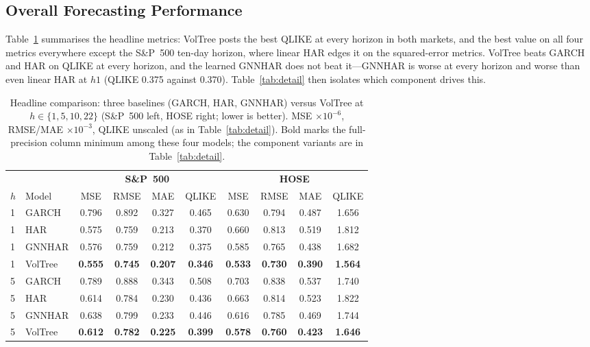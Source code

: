 \documentclass[runningheads]{llncs}
\begin{document}
\subsection{Overall Forecasting Performance}
Table~\ref{tab:summary} summarises the headline metrics: VolTree posts the best QLIKE at every horizon in
both markets, and the best value on all four metrics everywhere except the S\&P~500 ten-day horizon, where
linear HAR edges it on the squared-error metrics. VolTree beats GARCH and HAR on QLIKE at every horizon,
and the learned GNNHAR does not beat it---GNNHAR is worse at every horizon and worse than even linear HAR
at $h1$ (QLIKE 0.375 against 0.370). Table~\ref{tab:detail} then isolates which component drives this.

\begin{table}[h!]
\centering
\caption{Headline comparison: three baselines (GARCH, HAR, GNNHAR) versus VolTree at
$h\in\{1,5,10,22\}$ (S\&P~500 left, HOSE right; lower is better). MSE $\times10^{-6}$, RMSE/MAE
$\times10^{-3}$, QLIKE unscaled (as in Table~\ref{tab:detail}). Bold marks the full-precision column
minimum among these four models; the component variants are in Table~\ref{tab:detail}.}
\label{tab:summary}
\footnotesize
\setlength{\tabcolsep}{3pt}
\begin{tabular}{ll cccc cccc}
\toprule
& & \multicolumn{4}{c}{\textbf{S\&P~500}} & \multicolumn{4}{c}{\textbf{HOSE}} \\
\cmidrule(lr){3-6}\cmidrule(lr){7-10}
$h$ & Model & MSE & RMSE & MAE & QLIKE & MSE & RMSE & MAE & QLIKE \\
\midrule
1 & GARCH    & 0.796 & 0.892 & 0.327 & 0.465 & 0.630 & 0.794 & 0.487 & 1.656 \\
1 & HAR      & 0.575 & 0.759 & 0.213 & 0.370 & 0.660 & 0.813 & 0.519 & 1.812 \\
1 & GNNHAR   & 0.576 & 0.759 & 0.212 & 0.375 & 0.585 & 0.765 & 0.438 & 1.682 \\
1 & VolTree & \textbf{0.555} & \textbf{0.745} & \textbf{0.207} & \textbf{0.346} & \textbf{0.533} & \textbf{0.730} & \textbf{0.390} & \textbf{1.564} \\
\midrule
5 & GARCH    & 0.789 & 0.888 & 0.343 & 0.508 & 0.703 & 0.838 & 0.537 & 1.740 \\
5 & HAR      & 0.614 & 0.784 & 0.230 & 0.436 & 0.663 & 0.814 & 0.523 & 1.822 \\
5 & GNNHAR   & 0.638 & 0.799 & 0.233 & 0.446 & 0.616 & 0.785 & 0.469 & 1.744 \\
5 & VolTree & \textbf{0.612} & \textbf{0.782} & \textbf{0.225} & \textbf{0.399} & \textbf{0.578} & \textbf{0.760} & \textbf{0.423} & \textbf{1.646} \\

\end{tabular}
\end{table}
\end{document}
